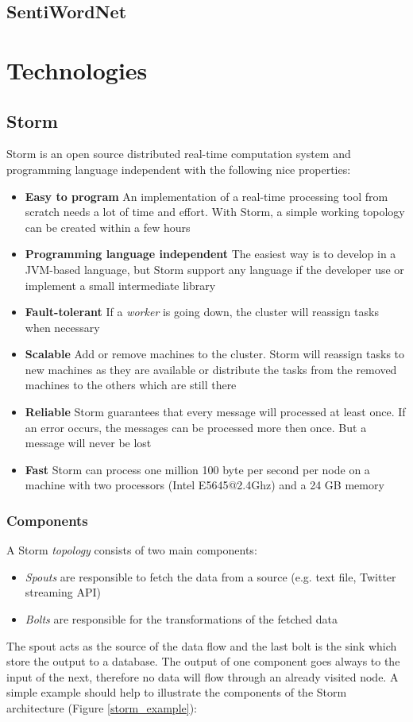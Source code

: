 \documentclass[a4paper]{article}
\begin{document}
\subsection{SentiWordNet}\label{sentiWordNet}

\section{Technologies}

\subsection{Storm}
Storm is an open source distributed real-time computation system and programming language independent with the following nice properties:
\begin{itemize}
	\item \textbf{Easy to program} An implementation of a real-time processing tool from scratch needs a lot of time and effort. With Storm, a simple working topology can be created within a few hours 
	\item \textbf{Programming language independent} The easiest way is to develop in a JVM-based language, but Storm support any language if the developer use or implement a small intermediate library 
	\item \textbf{Fault-tolerant} If a \textit{worker} is going down, the cluster will reassign tasks when necessary 
	\item \textbf{Scalable} Add or remove machines to the cluster. Storm will reassign tasks to new machines as they are available or distribute the tasks from the removed machines to the others which are still there 
	\item \textbf{Reliable} Storm guarantees that every message will processed at least once. If an error occurs, the messages can be processed more then once. But a message will never be lost 
	\item \textbf{Fast} Storm can process one million 100 byte per second per node on a machine with two processors (Intel E5645@2.4Ghz) and a 24 GB memory 
\end{itemize}
\subsubsection{Components}\label{storm_components}
A Storm \textit{topology} consists of two main components:
\begin{itemize}
	\item \textit{Spouts} are responsible to fetch the data from a source (e.g. text file, Twitter streaming API)
	\item \textit{Bolts} are responsible for the transformations of the fetched data
\end{itemize}
The spout acts as the source of the data flow and the last bolt is the sink which store the output to a database. The output of one component goes always to the input of the next, therefore no data will flow through an already visited node. A simple example should help to illustrate the components of the Storm architecture (Figure \ref{storm_example}):\\
\end{document}
